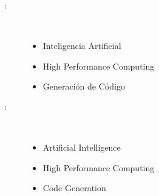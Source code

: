 \begin{multicols}{2}
\begin{description}
\item [\palabraschaveprincipal:] \mbox{} \\[-20pt]
  \begin{itemize}
    \item Inteligencia Artificial
    \item High Performance Computing
    \item Generación de Código
  \end{itemize}
\end{description}
\begin{description}
\item [\palabraschavesecundaria:] \mbox{} \\[-20pt]
  \begin{itemize}
    \item Artificial Intelligence
    \item High Performance Computing
    \item Code Generation
  \end{itemize}
\end{description}
\end{multicols}